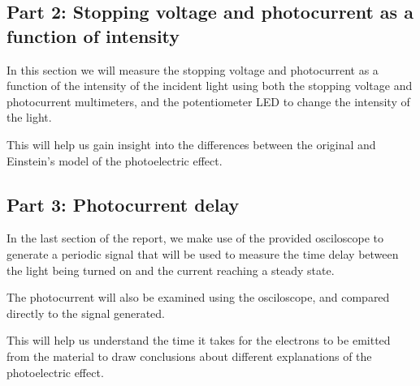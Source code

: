 \subsection{Part 2: Stopping voltage and photocurrent as a function of intensity}

In this section we will measure the stopping voltage and photocurrent as a function of the intensity of the incident light using both the stopping voltage and photocurrent multimeters,
and the potentiometer LED to change the intensity of the light.

This will help us gain insight into the differences between the original and Einstein's model of the photoelectric effect.

\subsection{Part 3: Photocurrent delay}

In the last section of the report, we make use of the provided osciloscope to generate a periodic signal that will be used to
measure the time delay between the light being turned on and the current reaching a steady state.

The photocurrent will also be examined using the osciloscope, and compared directly to the signal generated.


This will help us understand the time it takes for the electrons to be emitted from the material to draw conclusions about different explanations of the photoelectric effect.
